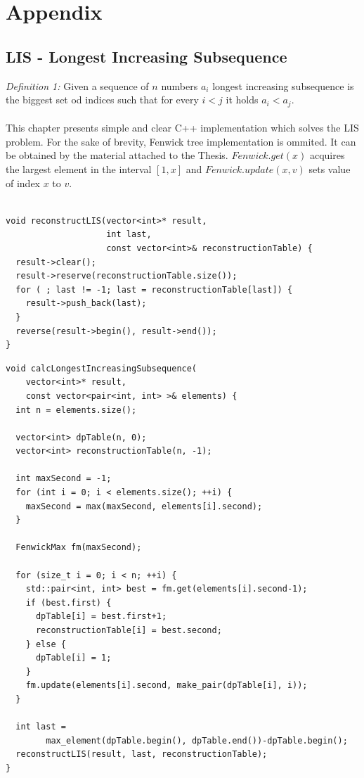 \documentclass[times, utf8, diplomski]{fer}
\begin{document}
\chapter{Appendix}

\section{LIS - Longest Increasing Subsequence\cite{Fredman197529}}
\emph{Definition 1:} Given a sequence of $n$ numbers $a_i$ longest increasing subsequence is the biggest set od indices such that for every $i < j$ it holds $a_i < a_j$.\\
\\
This chapter presents simple and clear C++ implementation which solves the LIS problem. For the sake of brevity, Fenwick tree implementation is ommited. It can be obtained by the material attached to the Thesis. $Fenwick.get(x)$ acquires the largest element in the interval $[1,x]$ and $Fenwick.update(x, v)$ sets value of index $x$ to $v$.


\begin{algorithm}[H]
\begin{lstlisting}

void reconstructLIS(vector<int>* result,
                    int last,
                    const vector<int>& reconstructionTable) {
  result->clear();
  result->reserve(reconstructionTable.size());
  for ( ; last != -1; last = reconstructionTable[last]) {
    result->push_back(last);
  }
  reverse(result->begin(), result->end());
}

\end{lstlisting}
\end{algorithm}


\begin{algorithm}[H]
\begin{lstlisting}
void calcLongestIncreasingSubsequence(
    vector<int>* result,
    const vector<pair<int, int> >& elements) {
  int n = elements.size();

  vector<int> dpTable(n, 0);
  vector<int> reconstructionTable(n, -1);

  int maxSecond = -1;
  for (int i = 0; i < elements.size(); ++i) {
    maxSecond = max(maxSecond, elements[i].second);
  }

  FenwickMax fm(maxSecond);

  for (size_t i = 0; i < n; ++i) {
    std::pair<int, int> best = fm.get(elements[i].second-1);
    if (best.first) {
      dpTable[i] = best.first+1;
      reconstructionTable[i] = best.second;
    } else {
      dpTable[i] = 1;
    }
    fm.update(elements[i].second, make_pair(dpTable[i], i));
  }

  int last = 
        max_element(dpTable.begin(), dpTable.end())-dpTable.begin();
  reconstructLIS(result, last, reconstructionTable);
}
\end{lstlisting}
\end{algorithm}
\end{document}
